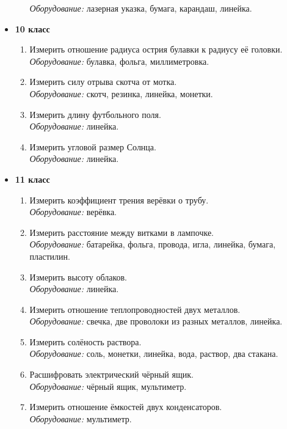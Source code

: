 \documentclass[12pt,a4paper,oneside,draft]{scrartcl}
\newlength{\h}
\newlength{\x}
\begin{document}
\begin{itemize}
\begin{enumerate}
    \textit{Оборудование:} лазерная указка, бумага, карандаш, линейка.
  \end{enumerate}
\item \textbf{10 класс}
  \begin{enumerate}
  \item Измерить отношение радиуса острия булавки к радиусу её
    головки. \\
    \textit{Оборудование:} булавка, фольга, миллиметровка.
  \item Измерить силу отрыва скотча от мотка. \\
    \textit{Оборудование:} скотч, резинка, линейка, монетки.
  \item Измерить длину футбольного поля. \\
    \textit{Оборудование:} линейка.
  \item Измерить угловой размер Солнца. \\
    \textit{Оборудование:} линейка. 
  \end{enumerate}
\item \textbf{11 класс}
  \begin{enumerate}
  \item Измерить коэффициент трения верёвки о трубу. \\
    \textit{Оборудование:} верёвка.
  \item Измерить расстояние между витками в лампочке.\\
    \textit{Оборудование:} батарейка, фольга, провода, игла, линейка,
    бумага, пластилин.
  \item Измерить высоту облаков. \\
    \textit{Оборудование:} линейка.
  \item Измерить отношение теплопроводностей двух металлов. \\
    \textit{Оборудование:} свечка, две проволоки из разных металлов,
    линейка.
  \item Измерить солёность раствора. \\
    \textit{Оборудование:} соль, монетки, линейка, вода, раствор, два
    стакана.
  \item Расшифровать электрический чёрный ящик. \\
    \textit{Оборудование:} чёрный ящик, мультиметр.
  \item Измерить отношение ёмкостей двух конденсаторов. \\
    \textit{Оборудование:} мультиметр. 
  \end{enumerate}
\end{itemize}
\end{document}
